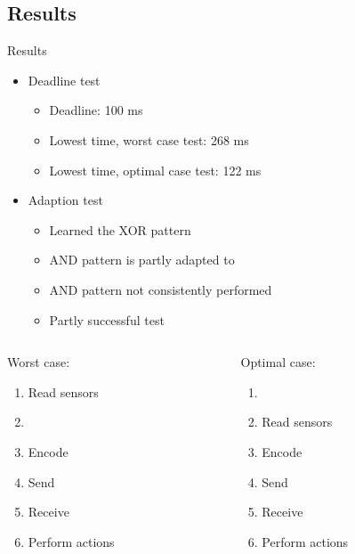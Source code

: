 \subsection{Results}
\begin{frame}{Results}
	\begin{itemize}
		\item Deadline test
      \begin{itemize}
        \item Deadline: 100 ms
        \item Lowest time, worst case test: 268 ms
        \item Lowest time, optimal case test: 122 ms
      \end{itemize}
    \item Adaption test
      \begin{itemize}
        \item Learned the XOR pattern
        \item AND pattern is partly adapted to
        \item AND pattern not consistently performed
        \item Partly successful test
      \end{itemize}
	\end{itemize}
  

  \begin{columns}
      \begin{column}{0.48\textwidth}
Worst case:
\begin{enumerate}
\setlength\itemsep{0.1em}
\item Read sensors
\item {\color{blue}{Timer button pressed}}
\item Encode
\item Send
\item Receive
\item Perform actions
\end{enumerate}
      \end{column}
      \begin{column}{0.48\textwidth}
Optimal case:
\begin{enumerate}
\setlength\itemsep{0.1em}
\item {\color{blue}{Timer button pressed}}
\item Read sensors
\item Encode
\item Send
\item Receive
\item Perform actions
\end{enumerate}
      \end{column}
  \end{columns}
\end{frame}


